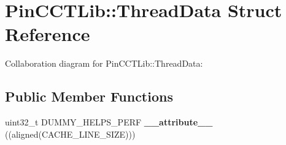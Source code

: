 \hypertarget{structPinCCTLib_1_1ThreadData}{\section{Pin\-C\-C\-T\-Lib\-:\-:Thread\-Data Struct Reference}
\label{structPinCCTLib_1_1ThreadData}
}


Collaboration diagram for Pin\-C\-C\-T\-Lib\-:\-:Thread\-Data\-:
\subsection*{Public Member Functions}
\begin{DoxyCompactItemize}
\item 
\hypertarget{structPinCCTLib_1_1ThreadData_a3d57be420421ce4b0664b76fa27757cc}{uint32\-\_\-t D\-U\-M\-M\-Y\-\_\-\-H\-E\-L\-P\-S\-\_\-\-P\-E\-R\-F {\bfseries \-\_\-\-\_\-attribute\-\_\-\-\_\-} ((aligned(C\-A\-C\-H\-E\-\_\-\-L\-I\-N\-E\-\_\-\-S\-I\-Z\-E)))}\label{structPinCCTLib_1_1ThreadData_a3d57be420421ce4b0664b76fa27757cc}

\end{DoxyCompactItemize}
